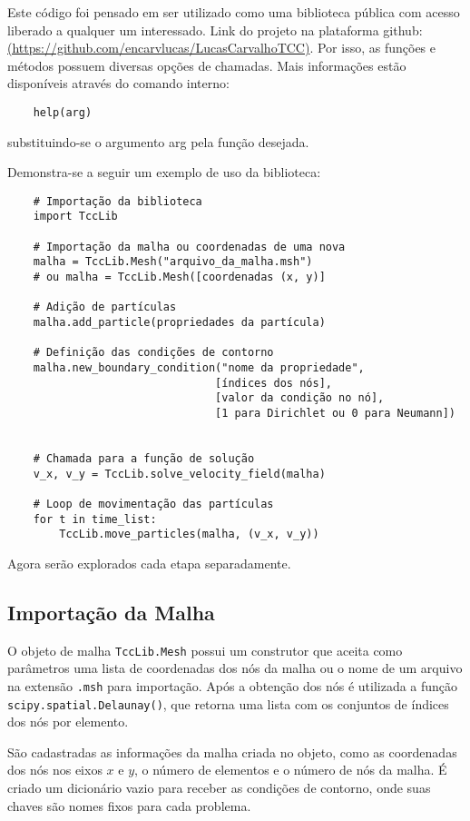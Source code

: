 Este código foi pensado em ser utilizado como uma biblioteca pública com acesso liberado a qualquer um interessado.
Link do projeto na plataforma github: \href{https://github.com/encarvlucas/LucasCarvalhoTCC}{(https://github.com/encarvlucas/LucasCarvalhoTCC)}.
Por isso, as funções e métodos possuem diversas opções de chamadas.
Mais informações estão disponíveis através do comando interno:
\begin{verbatim}
    help(arg)
\end{verbatim}
substituindo-se o argumento arg pela função desejada.

Demonstra-se a seguir um exemplo de uso da biblioteca:
\begin{verbatim}
    # Importação da biblioteca
    import TccLib

    # Importação da malha ou coordenadas de uma nova
    malha = TccLib.Mesh("arquivo_da_malha.msh")
    # ou malha = TccLib.Mesh([coordenadas (x, y)]
    
    # Adição de partículas
    malha.add_particle(propriedades da partícula)

    # Definição das condições de contorno
    malha.new_boundary_condition("nome da propriedade",
                                [índices dos nós], 
                                [valor da condição no nó],
                                [1 para Dirichlet ou 0 para Neumann])


    # Chamada para a função de solução
    v_x, v_y = TccLib.solve_velocity_field(malha)

    # Loop de movimentação das partículas
    for t in time_list:
        TccLib.move_particles(malha, (v_x, v_y))
\end{verbatim}

Agora serão explorados cada etapa separadamente.

\subsection{\textbf{Importação da Malha}}
O objeto de malha \verb|TccLib.Mesh| possui um construtor que aceita como parâmetros uma lista de coordenadas dos nós da malha ou o nome de um arquivo na extensão \verb|.msh| para importação.
Após a obtenção dos nós é utilizada a função \verb|scipy.spatial.Delaunay()|, que retorna uma lista com os conjuntos de índices dos nós por elemento.

São cadastradas as informações da malha criada no objeto, como as coordenadas dos nós nos eixos $x$ e $y$, o número de elementos e o número de nós da malha.
É criado um dicionário vazio para receber as condições de contorno, onde suas chaves são nomes fixos para cada problema.

